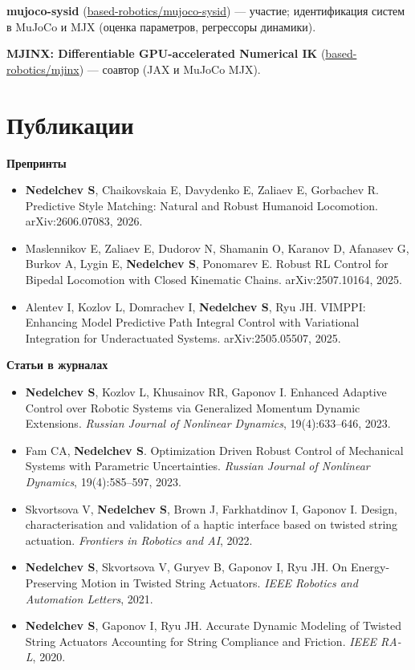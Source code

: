 \documentclass[11pt,a4paper]{article}
\newcommand{\cvitem}[2]{\item #1 #2}
\begin{document}
\textbf{mujoco-sysid} (\href{https://github.com/based-robotics/mujoco-sysid}{based-robotics/mujoco-sysid}) — участие; идентификация систем в MuJoCo и MJX (оценка параметров, регрессоры динамики).

\textbf{MJINX: Differentiable GPU-accelerated Numerical IK} (\href{https://github.com/based-robotics/mjinx}{based-robotics/mjinx}) — соавтор (JAX и MuJoCo MJX).

\section{Публикации}

\textbf{Препринты}
\begin{itemize}[leftmargin=*, nosep, topsep=0.25em]
  \cvitem{}{\textbf{Nedelchev S}, Chaikovskaia E, Davydenko E, Zaliaev E, Gorbachev R. Predictive Style Matching: Natural and Robust Humanoid Locomotion. arXiv:2606.07083, 2026.}
  \cvitem{}{Maslennikov E, Zaliaev E, Dudorov N, Shamanin O, Karanov D, Afanasev G, Burkov A, Lygin E, \textbf{Nedelchev S}, Ponomarev E. Robust RL Control for Bipedal Locomotion with Closed Kinematic Chains. arXiv:2507.10164, 2025.}
  \cvitem{}{Alentev I, Kozlov L, Domrachev I, \textbf{Nedelchev S}, Ryu JH. VIMPPI: Enhancing Model Predictive Path Integral Control with Variational Integration for Underactuated Systems. arXiv:2505.05507, 2025.}
\end{itemize}

\textbf{Статьи в журналах}
\begin{itemize}[leftmargin=*, nosep, topsep=0.25em]
  \cvitem{}{\textbf{Nedelchev S}, Kozlov L, Khusainov RR, Gaponov I. Enhanced Adaptive Control over Robotic Systems via Generalized Momentum Dynamic Extensions. \emph{Russian Journal of Nonlinear Dynamics}, 19(4):633--646, 2023.}
  \cvitem{}{Fam CA, \textbf{Nedelchev S}. Optimization Driven Robust Control of Mechanical Systems with Parametric Uncertainties. \emph{Russian Journal of Nonlinear Dynamics}, 19(4):585--597, 2023.}
  \cvitem{}{Skvortsova V, \textbf{Nedelchev S}, Brown J, Farkhatdinov I, Gaponov I. Design, characterisation and validation of a haptic interface based on twisted string actuation. \emph{Frontiers in Robotics and AI}, 2022.}
  \cvitem{}{\textbf{Nedelchev S}, Skvortsova V, Guryev B, Gaponov I, Ryu JH. On Energy-Preserving Motion in Twisted String Actuators. \emph{IEEE Robotics and Automation Letters}, 2021.}
  \cvitem{}{\textbf{Nedelchev S}, Gaponov I, Ryu JH. Accurate Dynamic Modeling of Twisted String Actuators Accounting for String Compliance and Friction. \emph{IEEE RA-L}, 2020.}
\end{itemize}
\end{document}
